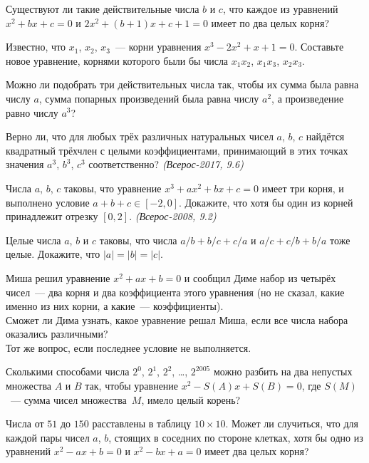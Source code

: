 \begin{problems}

\item
Существуют ли такие действительные числа $b$ и $c$, что каждое из уравнений
$x^{2} + b x + c = 0$ и $2 x^{2} + (b + 1) x + c + 1 = 0$ имеет по два целых
корня?

\item
Известно, что $x_1$, $x_2$, $x_3$~--- корни
уравнения $x^{3} - 2 x^{2} + x + 1 = 0$.
Составьте новое уравнение, корнями которого были бы числа
$x_1 x_2$, $x_1 x_3$, $x_2 x_3$.

\item
Можно ли подобрать три действительных числа так, чтобы их сумма была равна
числу $a$, сумма попарных произведений была равна числу $a^{2}$, а произведение
равно числу $a^{3}$?

\item
Верно ли, что для любых трёх различных натуральных чисел $a$, $b$, $c$
найдётся квадратный трёхчлен с целыми коэффициентами, принимающий в этих точках
значения $a^3$, $b^3$, $c^3$ соответственно?
\emph{(Всерос-2017, 9.6)}

\item
Числа $a$, $b$, $c$ таковы, что уравнение $x^{3} + a x^{2} + b x + c = 0$ имеет
три корня, и выполнено условие $a + b + c \in [-2, 0]$.
Докажите, что хотя бы один из корней принадлежит отрезку $[0, 2]$.
\emph{(Всерос-2008, 9.2)}

\item
Целые числа $a$, $b$ и $c$ таковы, что числа $a / b + b / c + c / a$
и $a / c + c / b + b / a$ тоже целые.
Докажите, что $|a| = |b| = |c|$.

\item
Миша решил уравнение $x^2 + a x + b = 0$ и сообщил Диме набор из четырёх
чисел~--- два корня и два коэффициента этого уравнения (но не сказал, какие
именно из них корни, а какие~--- коэффициенты).
\\
\subproblem
Сможет ли Дима узнать, какое уравнение решал Миша, если все числа набора оказались различными?
\\
\subproblem
Тот же вопрос, если последнее условие не выполняется.

\item
Сколькими способами числа $2^{0}$, $2^{1}$, $2^{2}$, \ldots, $2^{2005}$ можно
разбить на два непустых множества $A$ и $B$ так, чтобы уравнение
$x^2 - S(A) x + S(B) = 0$, где $S(M)$~--- сумма чисел множества~$M$, имело
целый корень?

\item
Числа от $51$ до $150$ расставлены в таблицу $10 \times 10$.
Может ли случиться, что для каждой пары чисел $a$, $b$, стоящих в соседних по
стороне клетках, хотя бы одно из уравнений
$x^{2} - a x + b = 0$ и $x^{2} - b x + a = 0$ имеет два целых корня?


\end{problems}

